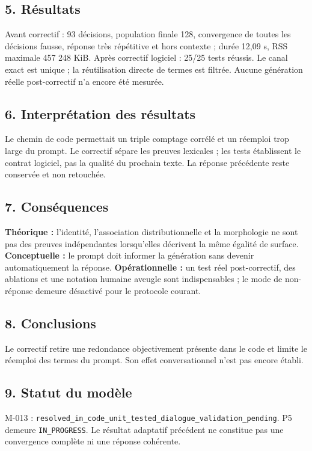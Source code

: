 \documentclass[11pt,a4paper]{report}
\begin{document}
\subsection*{5. Résultats}
Avant correctif : 93 décisions, population finale 128, convergence de toutes les décisions fausse, réponse très répétitive et hors contexte ; durée 12,09 s, RSS maximale 457 248 KiB. Après correctif logiciel : 25/25 tests réussis. Le canal exact est unique ; la réutilisation directe de termes est filtrée. Aucune génération réelle post-correctif n'a encore été mesurée.

\subsection*{6. Interprétation des résultats}
Le chemin de code permettait un triple comptage corrélé et un réemploi trop large du prompt. Le correctif sépare les preuves lexicales ; les tests établissent le contrat logiciel, pas la qualité du prochain texte. La réponse précédente reste conservée et non retouchée.

\subsection*{7. Conséquences}
\textbf{Théorique :} l'identité, l'association distributionnelle et la morphologie ne sont pas des preuves indépendantes lorsqu'elles décrivent la même égalité de surface.\newline
\textbf{Conceptuelle :} le prompt doit informer la génération sans devenir automatiquement la réponse.\newline
\textbf{Opérationnelle :} un test réel post-correctif, des ablations et une notation humaine aveugle sont indispensables ; le mode de non-réponse demeure désactivé pour le protocole courant.

\subsection*{8. Conclusions}
Le correctif retire une redondance objectivement présente dans le code et limite le réemploi des termes du prompt. Son effet conversationnel n'est pas encore établi.

\subsection*{9. Statut du modèle}
\begin{sloppypar}M-013 : \texttt{resolved\_in\_code\_unit\_tested\_dialogue\_validation\_pending}. P5 demeure \texttt{IN\_PROGRESS}. Le résultat adaptatif précédent ne constitue pas une convergence complète ni une réponse cohérente.\end{sloppypar}
\end{document}
